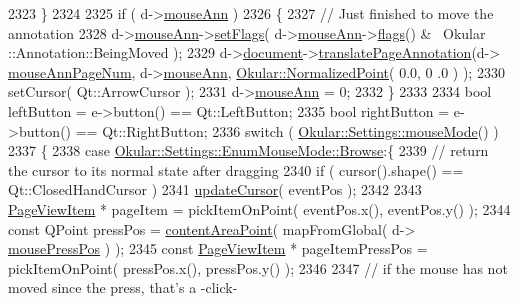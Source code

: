\begin{DoxyCode}
2323     \}
2324 
2325     \textcolor{keywordflow}{if} ( d->\hyperlink{classPageViewPrivate_ac92373de9a9cb5f2085b186a7e321a3b}{mouseAnn} )
2326     \{
2327         \textcolor{comment}{// Just finished to move the annotation}
2328         d->\hyperlink{classPageViewPrivate_ac92373de9a9cb5f2085b186a7e321a3b}{mouseAnn}->\hyperlink{classOkular_1_1Annotation_ab91b36dc7ecfd9cacba7761ec58145fd}{setFlags}( d->\hyperlink{classPageViewPrivate_ac92373de9a9cb5f2085b186a7e321a3b}{mouseAnn}->\hyperlink{classOkular_1_1Annotation_a3d6f7ee5057155b90e76c24768880947}{flags}() & ~Okular
      ::Annotation::BeingMoved );
2329         d->\hyperlink{classPageViewPrivate_a50645b9853306cffd74e51efb677e5b4}{document}->\hyperlink{classOkular_1_1Document_ab3ca55619ce1a60a4d60913a216ae01c}{translatePageAnnotation}(d->
      \hyperlink{classPageViewPrivate_a6e1d17de5ec97192d937dae41c89ff74}{mouseAnnPageNum}, d->\hyperlink{classPageViewPrivate_ac92373de9a9cb5f2085b186a7e321a3b}{mouseAnn}, \hyperlink{classOkular_1_1NormalizedPoint}{Okular::NormalizedPoint}( 0.0, 0
      .0 ) );
2330         setCursor( Qt::ArrowCursor );
2331         d->\hyperlink{classPageViewPrivate_ac92373de9a9cb5f2085b186a7e321a3b}{mouseAnn} = 0;
2332     \}
2333 
2334     \textcolor{keywordtype}{bool} leftButton = e->button() == Qt::LeftButton;
2335     \textcolor{keywordtype}{bool} rightButton = e->button() == Qt::RightButton;
2336     \textcolor{keywordflow}{switch} ( \hyperlink{classOkular_1_1Settings_af8e39e25e841b413d67af2cb4dfc0688}{Okular::Settings::mouseMode}() )
2337     \{
2338         \textcolor{keywordflow}{case} \hyperlink{classOkular_1_1Settings_1_1EnumMouseMode_ab2ae04e2d7d069f02195ccf32c52415bae5c77f74b0cf35d7838da1baaad4e822}{Okular::Settings::EnumMouseMode::Browse}:\{
2339             \textcolor{comment}{// return the cursor to its normal state after dragging}
2340             \textcolor{keywordflow}{if} ( cursor().shape() == Qt::ClosedHandCursor )
2341                 \hyperlink{classPageView_a0054ba6d2967fa31dea42dcc9d9020b6}{updateCursor}( eventPos );
2342 
2343             \hyperlink{classPageViewItem}{PageViewItem} * pageItem = pickItemOnPoint( eventPos.x(), eventPos.y() );
2344             \textcolor{keyword}{const} QPoint pressPos = \hyperlink{classPageView_a7f432d3d6d05c69b568ad66a9c232cd7}{contentAreaPoint}( mapFromGlobal( d->
      \hyperlink{classPageViewPrivate_aa4799ae3aa24957d19a95220d8f61216}{mousePressPos} ) );
2345             \textcolor{keyword}{const} \hyperlink{classPageViewItem}{PageViewItem} * pageItemPressPos = pickItemOnPoint( pressPos.x(), pressPos.y()
       );
2346 
2347             \textcolor{comment}{// if the mouse has not moved since the press, that's a -click-}

\end{DoxyCode}
